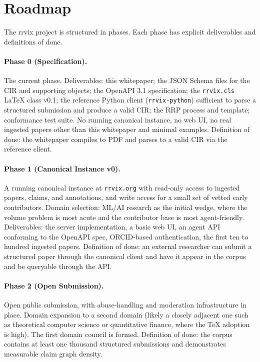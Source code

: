 \documentclass[11pt]{rrvix}
\begin{document}
\section{Roadmap}
\label{sec:roadmap}

The rrvix project is structured in phases. Each phase has explicit deliverables and definitions of done.

\paragraph{Phase 0 (Specification).} The current phase. Deliverables: this whitepaper; the JSON Schema files for the CIR and supporting objects; the OpenAPI 3.1 specification; the \texttt{rrvix.cls} LaTeX class v0.1; the reference Python client (\texttt{rrvix-python}) sufficient to parse a structured submission and produce a valid CIR; the RRP process and template; conformance test suite. No running canonical instance, no web UI, no real ingested papers other than this whitepaper and minimal examples. Definition of done: the whitepaper compiles to PDF and parses to a valid CIR via the reference client.

\paragraph{Phase 1 (Canonical Instance v0).} A running canonical instance at \texttt{rrvix.org} with read-only access to ingested papers, claims, and annotations, and write access for a small set of vetted early contributors. Domain selection: ML/AI research as the initial wedge, where the volume problem is most acute and the contributor base is most agent-friendly. Deliverables: the server implementation, a basic web UI, an agent API conforming to the OpenAPI spec, ORCID-based authentication, the first ten to hundred ingested papers. Definition of done: an external researcher can submit a structured paper through the canonical client and have it appear in the corpus and be queryable through the API.

\paragraph{Phase 2 (Open Submission).} Open public submission, with abuse-handling and moderation infrastructure in place. Domain expansion to a second domain (likely a closely adjacent one such as theoretical computer science or quantitative finance, where the TeX adoption is high). The first domain council is formed. Definition of done: the corpus contains at least one thousand structured submissions and demonstrates measurable claim graph density.
\end{document}
